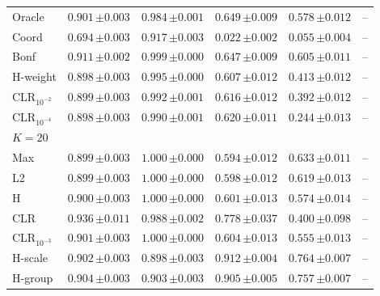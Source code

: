 \begin{tabular}{lccccc}
Oracle & $0.901\,{\scriptstyle\pm 0.003}$ & $0.984\,{\scriptstyle\pm 0.001}$ & $0.649\,{\scriptstyle\pm 0.009}$ & $0.578\,{\scriptstyle\pm 0.012}$ & -- \\
Coord & $0.694\,{\scriptstyle\pm 0.003}$ & $0.917\,{\scriptstyle\pm 0.003}$ & $0.022\,{\scriptstyle\pm 0.002}$ & $0.055\,{\scriptstyle\pm 0.004}$ & -- \\
Bonf & $0.911\,{\scriptstyle\pm 0.002}$ & $0.999\,{\scriptstyle\pm 0.000}$ & $0.647\,{\scriptstyle\pm 0.009}$ & $0.605\,{\scriptstyle\pm 0.011}$ & -- \\
H-weight & $0.898\,{\scriptstyle\pm 0.003}$ & $0.995\,{\scriptstyle\pm 0.000}$ & $0.607\,{\scriptstyle\pm 0.012}$ & $0.413\,{\scriptstyle\pm 0.012}$ & -- \\
CLR$_{10^{-2}}$ & $0.899\,{\scriptstyle\pm 0.003}$ & $0.992\,{\scriptstyle\pm 0.001}$ & $0.616\,{\scriptstyle\pm 0.012}$ & $0.392\,{\scriptstyle\pm 0.012}$ & -- \\
CLR$_{10^{-4}}$ & $0.898\,{\scriptstyle\pm 0.003}$ & $0.990\,{\scriptstyle\pm 0.001}$ & $0.620\,{\scriptstyle\pm 0.011}$ & $0.244\,{\scriptstyle\pm 0.013}$ & -- \\
\midrule
\multicolumn{6}{l}{$K=20$} \\
Max & $0.899\,{\scriptstyle\pm 0.003}$ & $1.000\,{\scriptstyle\pm 0.000}$ & $0.594\,{\scriptstyle\pm 0.012}$ & $0.633\,{\scriptstyle\pm 0.011}$ & -- \\
L2 & $0.899\,{\scriptstyle\pm 0.003}$ & $1.000\,{\scriptstyle\pm 0.000}$ & $0.598\,{\scriptstyle\pm 0.012}$ & $0.619\,{\scriptstyle\pm 0.013}$ & -- \\
H & $0.900\,{\scriptstyle\pm 0.003}$ & $1.000\,{\scriptstyle\pm 0.000}$ & $0.601\,{\scriptstyle\pm 0.013}$ & $0.574\,{\scriptstyle\pm 0.014}$ & -- \\
CLR & $0.936\,{\scriptstyle\pm 0.011}$ & $0.988\,{\scriptstyle\pm 0.002}$ & $0.778\,{\scriptstyle\pm 0.037}$ & $0.400\,{\scriptstyle\pm 0.098}$ & -- \\
CLR$_{10^{-3}}$ & $0.901\,{\scriptstyle\pm 0.003}$ & $1.000\,{\scriptstyle\pm 0.000}$ & $0.604\,{\scriptstyle\pm 0.013}$ & $0.555\,{\scriptstyle\pm 0.013}$ & -- \\
H-scale & $0.902\,{\scriptstyle\pm 0.003}$ & $0.898\,{\scriptstyle\pm 0.003}$ & $0.912\,{\scriptstyle\pm 0.004}$ & $0.764\,{\scriptstyle\pm 0.007}$ & -- \\
H-group & $0.904\,{\scriptstyle\pm 0.003}$ & $0.903\,{\scriptstyle\pm 0.003}$ & $0.905\,{\scriptstyle\pm 0.005}$ & $0.757\,{\scriptstyle\pm 0.007}$ & -- \\

\end{tabular}
